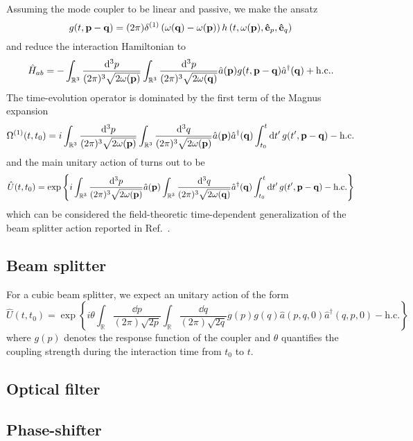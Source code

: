Assuming the mode coupler to be linear and passive, we make the ansatz
\begin{equation}
	g(t,\vb{p}-\vb{q})
	=
	(2\pi)
	\delta^{(1)}\left(\omega(\vb{q})-\omega(\vb{p})\right)
	h\left(t,\omega(\vb{p}),\vu{e}_p,\vu{e}_q\right)
\end{equation}
and reduce the interaction Hamiltonian to
\begin{equation}
	\hat{H}_{ab}
	=
	-
	\int_{\mathbb{R}^3}
	\frac{\dd[3]{p}}{(2\pi)^3\sqrt{2\omega(\vb{p})}}
	\int_{\mathbb{R}^3}
	\frac{\dd[3]{p}}{(2\pi)^3\sqrt{2\omega(\vb{q})}}
	\hat{a}(\vb{p})
	g(t,\vb{p}-\vb{q})
	\hat{a}^\dagger(\vb{q})
	+
	\text{h.c.}
	.
\end{equation}
The time-evolution operator is dominated by the first term of the Magnus expansion
\begin{equation}
	\Omega^{(1)}(t,t_0)
	=
	i
	\int_{\mathbb{R}^3}
	\frac{\dd[3]{p}}{(2\pi)^3\sqrt{2\omega(\vb{p})}}
	\int_{\mathbb{R}^3}
	\frac{\dd[3]{q}}{(2\pi)^3\sqrt{2\omega(\vb{p})}}
	\hat{a}(\vb{p})
	\hat{a}^\dagger(\vb{q})
	\int_{t_0}^t
	\dd{t^\prime}
	g(t^\prime,\vb{p}-\vb{q})
	-
	\text{h.c.}
\end{equation}
and the main unitary action of turns out to be
\begin{equation}
	\hat{U}(t,t_0)
	=
	\exp\left\{
		i
		\int_{\mathbb{R}^3}
		\frac{\dd[3]{p}}{(2\pi)^3\sqrt{2\omega(\vb{p})}}
		\hat{a}(\vb{p})
		\int_{\mathbb{R}^3}
		\frac{\dd[3]{q}}{(2\pi)^3\sqrt{2\omega(\vb{q})}}
		\hat{a}^\dagger(\vb{q})
		\int_{t_0}^t
		\dd{t^\prime}
		g(t^\prime,\vb{p}-\vb{q})
		-
		\text{h.c.}
	\right\}
\end{equation}
which can be considered the field-theoretic time-dependent generalization of the beam splitter action reported in Ref.~\cite{Leonhardt2003,Haroche2006}.

\subsection{Beam splitter}

For a cubic beam splitter, we expect an unitary action of the form
\begin{equation}
	\hat{U}(t,t_0)
	=
	\exp\left\{
		i\theta
		\int_{\mathbb{R}}
		\frac{\dd{p}}{(2\pi)\sqrt{2p}}
		\int_{\mathbb{R}}
		\frac{\dd{q}}{(2\pi)\sqrt{2q}}
		g(p)
		g(q)
		\hat{a}(p,q,0)
		\hat{a}^\dagger(q,p,0)
		-
		\text{h.c.}
	\right\}
\end{equation}
where $g(p)$ denotes the response function of the coupler and $\theta$ quantifies the coupling strength during the interaction time from $t_0$ to $t$.

\subsection{Optical filter}

\subsection{Phase-shifter}